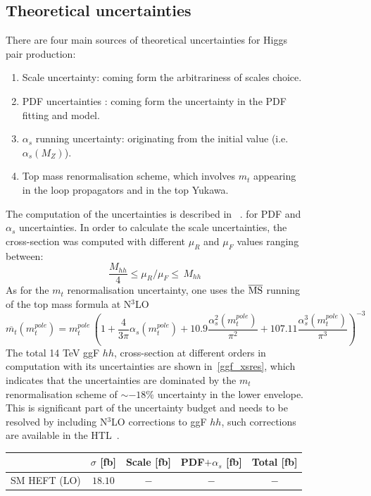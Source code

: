 \begin{figure}[!htpb]
\subsection{Theoretical uncertainties}
There are four main sources of theoretical uncertainties for Higgs pair production:
\begin{enumerate}
	\item Scale uncertainty: coming form the arbitrariness of scales choice.
	\item PDF uncertainties : coming form the uncertainty in the PDF fitting and model.
	\item $\alpha_s$ running uncertainty: originating from the initial value (i.e. $\alpha_s(M_Z) $).
	\item Top mass renormalisation scheme, which involves $m_t$ appearing in the loop propagators and in the top Yukawa.
\end{enumerate}
The computation of the uncertainties is described in ~\cite{Martin:2009bu, Demartin:2010er}. for PDF and $\alpha_s$ uncertainties.
In order to calculate the scale uncertainties, the cross-section was computed with different $ \mu_R$ and $\mu_F$ values ranging between:
\begin{equation}
	\frac{M_{hh}}{4} \leq \mu_R/\mu_F  \leq \,M_{hh}
\end{equation}
As for the $m_t$ renormalisation uncertainty, one uses the $\overline{\mathrm{MS}}$ running of the top mass formula at N$^3$LO~\cite{Baglio:2020wgt}
\begin{equation}
	\overline{m_t} (m_t^{pole}) =m_t^{pole}\, \left( 1+\frac{4}{3 \pi} \alpha_s(m_t^{pole})+10.9 \frac{\alpha^2_s(m_t^{pole})}{\pi^2} +107.11 \frac{\alpha^3_s(m_t^{pole})}{\pi^3} \right) ^{-3} 
\end{equation}
The total 14 TeV ggF $hh$, cross-section at different orders in computation with its uncertainties are shown in~\autoref{ggf_xsres}, which indicates that the uncertainties are dominated by the $m_t$ renormalisation scheme of $\sim -18\%$ uncertainty in the lower envelope.  This is significant part of the uncertainty budget and needs to be resolved by including N$^3$LO corrections to ggF $hh$, such corrections are available in the  HTL~\cite{Chen:2019lzz,Chen:2019fhs}. 
%
\begin{table}
	\centering
	\begin{tabular}{ccccc}
		\toprule
		& $ \sigma$	[fb] & Scale [fb] & PDF$+\alpha_s$ [fb]& Total [fb] \\
		\midrule
		SM HEFT  (LO)      &  $ 18.10$    &   $-$      & $-$   &  $-$ \\

\end{tabular}
\end{table}
\end{figure}
